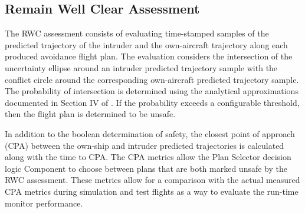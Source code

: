 \subsection{Remain Well Clear Assessment} 
The RWC assessment consists of evaluating time-stamped samples of the predicted trajectory of the intruder and the own-aircraft trajectory along each produced avoidance flight plan. The evaluation considers the intersection of the uncertainty ellipse around an intruder predicted trajectory sample with the conflict circle around the corresponding own-aircraft predicted trajectory sample. The probability of intersection is determined using the analytical approximations documented in Section IV of \cite{prob_conflict_detection}. If the probability exceeds a configurable threshold, then the flight plan is determined to be unsafe. 

In addition to the boolean determination of safety, the closest point of approach (CPA) between the own-ship and intruder predicted trajectories is calculated along with the time to CPA. The CPA metrics allow the Plan Selector decision logic Component to choose between plans that are both marked unsafe by the RWC assessment. These metrics allow for a comparison with the actual measured CPA metrics during simulation and test flights as a way to evaluate the run-time monitor performance.

